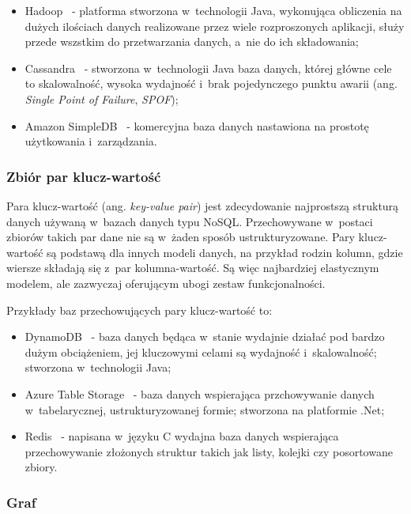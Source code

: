 \begin{itemize}
 \item Hadoop~\cite{hadoop} - platforma stworzona w~technologii Java, wykonująca obliczenia na dużych ilościach danych realizowane przez wiele rozproszonych aplikacji, służy przede wszstkim do przetwarzania danych, a~nie do ich składowania;
 \item Cassandra~\cite{cassandra} - stworzona w~technologii Java baza danych, której główne cele to skalowalność, wysoka wydajność i~brak pojedynczego punktu awarii (ang. \emph{Single Point of Failure}, \emph{SPOF});
 \item Amazon SimpleDB~\cite{simple_db} - komercyjna baza danych nastawiona na prostotę użytkowania i~zarządzania.
\end{itemize}

\subsubsection{Zbiór par klucz-wartość}

Para klucz-wartość (ang. \emph{key-value pair}) jest zdecydowanie najprostszą strukturą danych używaną w~bazach danych typu NoSQL.
Przechowywane w~postaci zbiorów takich par dane nie są w~żaden sposób ustrukturyzowane.
Pary klucz-wartość są podstawą dla innych modeli danych, na przykład rodzin kolumn, gdzie wiersze składają się z~par kolumna-wartość.
Są więc najbardziej elastycznym modelem, ale zazwyczaj oferującym ubogi zestaw funkcjonalności.

Przykłady baz przechowujących pary klucz-wartość to:

\begin{itemize}
 \item DynamoDB~\cite{dynamo_db} - baza danych będąca w~stanie wydajnie działać pod bardzo dużym obciążeniem, jej kluczowymi celami są wydajność i~skalowalność; stworzona w~technologii Java;
 \item Azure Table Storage~\cite{azure_table_storage} - baza danych wspierająca przchowywanie danych w~tabelarycznej, ustrukturyzowanej formie; stworzona na platformie .Net;
 \item Redis~\cite{redis} - napisana w~języku C wydajna baza danych wspierająca przechowywanie złożonych struktur takich jak listy, kolejki czy posortowane zbiory.
\end{itemize}

\subsubsection{Graf}

